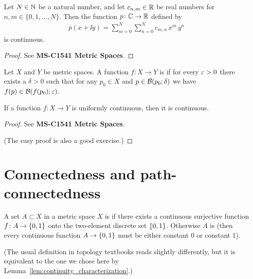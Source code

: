 \begin{corollary}
  \label{cor:multivariate_polynomial_continuous}
  Let $N \in \mathbb{N}$ be a natural number, and let
  $c_{n,m} \in \mathbb{R}$ be real numbers for $n,m \in \{0,1,\ldots,N\}$.
  Then the function $p \colon \mathbb{C} \to \mathbb{R}$ defined by
  \begin{align*}
    p(x + \ii y) = \sum_{m=0}^N \sum_{n=0}^N c_{m,n} \, x^m \, y^n
  \end{align*}
  is continuous.
\end{corollary}
\begin{proof}
  See \textbf{MS-C1541 Metric Spaces}.
\end{proof}

\begin{definition}
  \label{def:uniformly_continuous}
  Let $X$ and $Y$ be metric spaces.
  A function $f \colon X \to Y$ is  if
  for every $\varepsilon > 0$ there exists a $\delta > 0$ such that for
  any $p_0 \in X$ and $p \in \mathcal{B}(p_0; \delta)$
  we have $f(p) \in \mathcal{B}(f(p_0); \varepsilon)$.
\end{definition}

\begin{lemma}
  \label{lem:uniformly_continuous_implies_continuous}
  If a function $f \colon X \to Y$ is uniformly continuous, then it is continuous.
\end{lemma}
\begin{proof}
  See \textbf{MS-C1541 Metric Spaces}.

  (The easy proof is also a good exercise.)
\end{proof}


\section{Connectedness and path-connectedness}

\begin{definition}[Connectedness]
  \label{def:connected}
  A set $A \subset X$ in a metric space $X$
  is  if there exists
  a continuous surjective function
  $f \colon A \to \left\{ 0,1 \right\}$ onto the two-element discrete
  set $\left\{ 0,1 \right\}$.
  Otherwise $A$ is 
  (then every continuous function $A \to \left\{ 0,1 \right\}$ must be
  either constant $0$ or constant $1$).

  (The usual definition in topology textbooks reads
  slightly differently, but it is
  equivalent to the one we chose here by
  Lemma~\ref{lem:continuity_characterization}.)
\end{definition}

